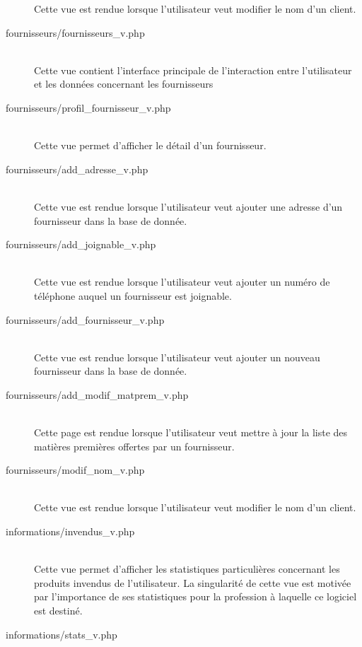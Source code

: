 \begin{description}
                Cette vue est rendue lorsque l'utilisateur veut modifier le
                nom d'un client.
            \item[fournisseurs/fournisseurs\_v.php]\hfill \\  
                Cette vue contient l'interface principale de l'interaction
                entre l'utilisateur et les données concernant les fournisseurs
            \item[fournisseurs/profil\_fournisseur\_v.php]\hfill \\
                Cette vue permet d'afficher le détail d'un fournisseur.
            \item[fournisseurs/add\_adresse\_v.php]\hfill \\      
                Cette vue est rendue lorsque l'utilisateur veut ajouter une
                adresse d'un fournisseur dans la base de donnée.
            \item[fournisseurs/add\_joignable\_v.php]\hfill \\      
                Cette vue est rendue lorsque l'utilisateur veut ajouter un
                numéro de téléphone auquel un fournisseur est joignable.
            \item[fournisseurs/add\_fournisseur\_v.php]\hfill \\  
                Cette vue est rendue lorsque l'utilisateur veut ajouter un
                nouveau fournisseur dans la base de donnée.
            \item[fournisseurs/add\_modif\_matprem\_v.php]\hfill \\  
                Cette page est rendue lorsque l'utilisateur veut mettre à
                jour la liste des matières premières offertes par un
                fournisseur.
            \item[fournisseurs/modif\_nom\_v.php]\hfill \\
                Cette vue est rendue lorsque l'utilisateur veut modifier le
                nom d'un client.
            \item[informations/invendus\_v.php]\hfill \\
                Cette vue permet d'afficher les statistiques particulières
                concernant les produits invendus de l'utilisateur. La
                singularité de cette vue est motivée par l'importance de ses
                statistiques pour la profession à laquelle ce logiciel est
                destiné.
            \item[informations/stats\_v.php]\hfill \\

\end{description}
